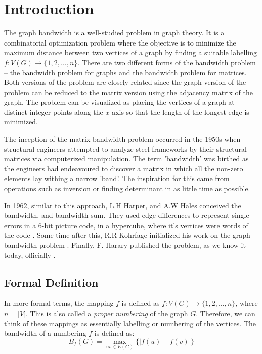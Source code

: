 \documentclass[conference,compsoc]{IEEEtran}
\begin{document}
\section{Introduction} 
The graph bandwidth is a well-studied problem in graph theory. It is a combinatorial optimization problem where the objective 
is to minimize the maximum distance between two vertices of a graph by finding a suitable labelling $f: V(G) \to \{1, 2, \dots, n\}$.
There are two different forms of the bandwidth problem -- the bandwidth problem for graphs and the bandwidth problem for matrices. 
Both versions of the problem are closely related since the graph version of the problem can be reduced to the matrix version using 
the adjacency matrix of the graph. 
The problem can be visualized as placing the vertices of a graph at distinct integer points along the $x$-axis so that the 
length of the longest edge is minimized. 

The inception of the matrix bandwidth problem occurred in the 1950s when structural engineers 
attempted to analyze steel frameworks by their structural matrices via computerized manipulation. The term 'bandwidth' 
was birthed as the engineers had endeavoured to discover a matrix in which all the non-zero elements 
lay withing a narrow 'band'. The inspiration for this came from operations such as 
inversion or finding determinant in as little time as possible.

In 1962, similar to this approach, L.H Harper, and A.W Hales conceived the bandwidth, 
and bandwidth sum. They used edge differences to represent single errors in a 6-bit picture code, 
in a hypercube, where it's vertices were words of the code \cite{10.2307/2946514}. Some time after this, 
R.R Kohrfage initialized his work on the graph bandwidth problem \cite{ccdg1982}. Finally, F. Harary 
published the problem, as we know it today, officially \cite{https://doi.org/10.1002/bimj.19660080427}.

\subsection{Formal Definition} \label{intro}
In more formal terms, 
the mapping $f$ is defined as $f: V(G) \to \{1, 2, \dots, n\}$, where $n = |V|$. This is also called 
a \emph{proper numbering} of the graph $G$.\cite{Lee2016} Therefore, 
we can think of these mappings as essentially labelling or numbering of the vertices. The bandwidth of a numbering $f$
is defined as:
\begin{equation}
B_f(G) = \max_{uv \in E(G)}\{|f(u) - f(v)|\}
\end{equation}
\end{document}

